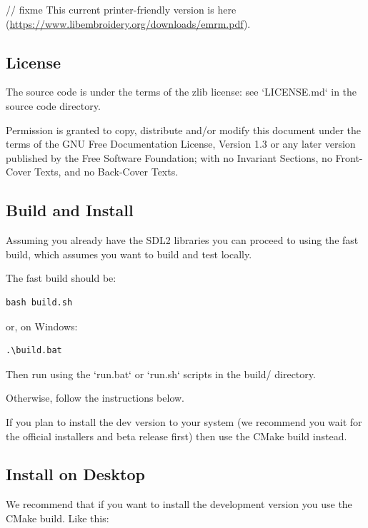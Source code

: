\documentclass[a4paper]{report}
\begin{document}
// fixme
This current printer-friendly version
is here (\url{https://www.libembroidery.org/downloads/emrm.pdf}).

\subsection{License}

The source code is under the terms of the zlib license: see `LICENSE.md`
in the source code directory.

Permission is granted to copy, distribute and/or modify this document
under the terms of the GNU Free Documentation License, Version 1.3
or any later version published by the Free Software Foundation;
with no Invariant Sections, no Front-Cover Texts, and no Back-Cover Texts.


\subsection{Build and Install}

Assuming you already have the SDL2 libraries you can proceed to using the fast build, which
assumes you want to build and test locally.

The fast build should be:

\begin{verbatim}
bash build.sh
\end{verbatim}

or, on Windows:

\begin{verbatim}
.\build.bat
\end{verbatim}

Then run using the `run.bat` or `run.sh` scripts in the build/ directory.

Otherwise, follow the instructions below.

If you plan to install the dev version to your system (we recommend you wait
for the official installers and beta release first) then use the CMake build
instead.

\subsection{Install on Desktop}

We recommend that if you want to install the development version you use the CMake build. Like
this:
\end{document}
